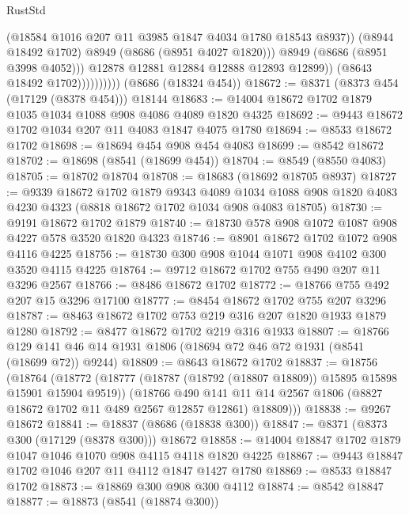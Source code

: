 \begin{lexlean}{RustStd}
\begin{coremodule}
                                (@18584 @1016 @207 @11 @3985 @1847 @4034 @1780 @18543 @8937))
                              (@8944 @18492 @1702)
                              @8949
                              (@8686 (@8951 @4027 @1820)))
                            @8949
                            (@8686 (@8951 @3998 @4052)))
                          @12878
                          @12881
                          @12884
                          @12888
                          @12893
                          @12899))
                      (@8643 @18492 @1702))))))))))
    (@8686 (@18324 @454))
@18672 := @8371 (@8373 @454 (@17129 (@8378 @454))) @18144
@18683 := @14004 @18672 @1702 @1879 @1035 @1034 @1088 @908 @4086 @4089 @1820 @4325
@18692 := @9443 @18672 @1702 @1034 @207 @11 @4083 @1847 @4075 @1780
@18694 := @8533 @18672 @1702
@18698 := @18694 @454 @908 @454 @4083
@18699 := @8542 @18672
@18702 := @18698 (@8541 (@18699 @454))
@18704 := @8549 (@8550 @4083)
@18705 := @18702 @18704
@18708 := @18683 (@18692 @18705 @8937)
@18727 := @9339
    @18672
    @1702
    @1879
    @9343
    @4089
    @1034
    @1088
    @908
    @1820
    @4083
    @4230
    @4323
    (@8818 @18672 @1702 @1034 @908 @4083 @18705)
@18730 := @9191 @18672 @1702 @1879
@18740 := @18730 @578 @908 @1072 @1087 @908 @4227 @578 @3520 @1820 @4323
@18746 := @8901 @18672 @1702 @1072 @908 @4116 @4225
@18756 := @18730 @300 @908 @1044 @1071 @908 @4102 @300 @3520 @4115 @4225
@18764 := @9712 @18672 @1702 @755 @490 @207 @11 @3296 @2567
@18766 := @8486 @18672 @1702
@18772 := @18766 @755 @492 @207 @15 @3296 @17100
@18777 := @8454 @18672 @1702 @755 @207 @3296
@18787 := @8463 @18672 @1702 @753 @219 @316 @207 @1820 @1933 @1879 @1280
@18792 := @8477 @18672 @1702 @219 @316 @1933
@18807 := @18766 @129 @141 @46 @14 @1931 @1806 (@18694 @72 @46 @72 @1931 (@8541 (@18699 @72)) @9244)
@18809 := @8643 @18672 @1702
@18837 := @18756
    (@18764
      (@18772
        (@18777 (@18787 (@18792 (@18807 @18809)) @15895 @15898 @15901 @15904 @9519))
        (@18766
          @490
          @141
          @11
          @14
          @2567
          @1806
          (@8827 @18672 @1702 @11 @489 @2567 @12857 @12861)
          @18809)))
@18838 := @9267 @18672
@18841 := @18837 (@8686 (@18838 @300))
@18847 := @8371 (@8373 @300 (@17129 (@8378 @300))) @18672
@18858 := @14004 @18847 @1702 @1879 @1047 @1046 @1070 @908 @4115 @4118 @1820 @4225
@18867 := @9443 @18847 @1702 @1046 @207 @11 @4112 @1847 @1427 @1780
@18869 := @8533 @18847 @1702
@18873 := @18869 @300 @908 @300 @4112
@18874 := @8542 @18847
@18877 := @18873 (@8541 (@18874 @300))

\end{coremodule}
\end{lexlean}
